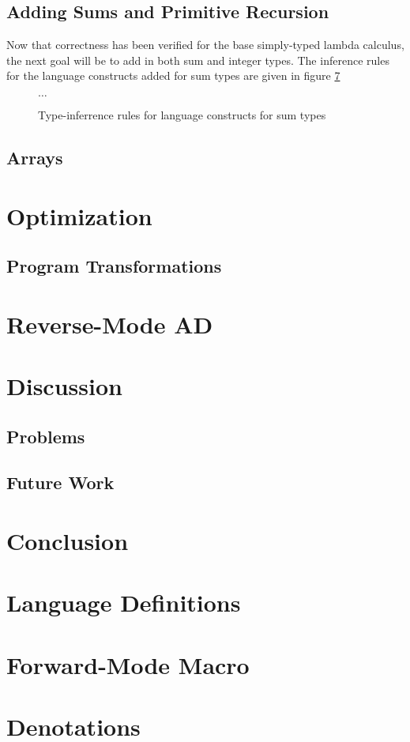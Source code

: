 \documentclass[11pt, final]{article}
\begin{document}
  \subsection{Adding Sums and Primitive Recursion}
    Now that correctness has been verified for the base simply-typed lambda calculus, the next goal will be to add in both sum and integer types.
    The inference rules for the language constructs added for sum types are given in figure \ref{}

    \begin{figure}[H]
      $\dots$
      \caption{Type-inferrence rules for language constructs for sum types}
      \label{fig:base_infer}
    \end{figure}

  \subsection{Arrays}
\section{Optimization}
  \subsection{Program Transformations}
\section{Reverse-Mode AD}
\section{Discussion}
  \subsection{Problems}
  \subsection{Future Work}
\section{Conclusion}

\appendix
\section{Language Definitions}
\section{Forward-Mode Macro}
\section{Denotations}
\printbibliography
\makeatother
\end{document}
